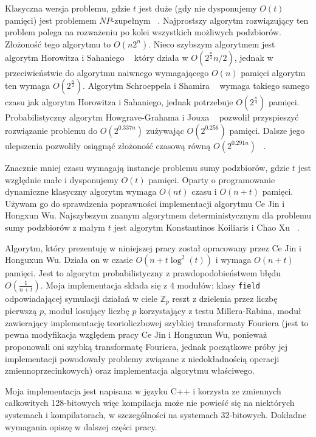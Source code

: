 \documentclass{article}
\begin{document}
Klasyczna wersja problemu, gdzie $t$ jest duże (gdy nie dysponujemy $O(t)$ pamięci) jest problemem 
$NP$-zupełnym ~\cite{sasamoto2001statistical}. Najprostszy algorytm rozwiązujący ten problem polega na rozważeniu po kolei wszystkich 
możliwych podzbiorów. Złożoność tego algorytmu to $O(n2^n)$. Nieco szybszym algorytmem jest algorytm Horowitza
i Sahaniego ~\cite{horowitz1974computing} który działa w $O(2^{\frac{n}{2}}n/2)$, jednak w przeciwieństwie do algorytmu naiwnego wymagającego
$O(n)$ pamięci algorytm ten wymaga $O(2^{\frac{n}{2}})$. Algorytm Schroeppela i Shamira ~\cite{schroeppel1981t} wymaga takiego samego
czasu jak algorytm Horowitza i Sahaniego, jednak potrzebuje $O(2^{\frac{n}{4}})$ pamięci. Probabilistyczny 
algorytm Howgrave-Grahama i Jouxa ~\cite{howgrave2010new} pozwolił przyspieszyć rozwiązanie problemu do $O(2^{0.337n})$
zużywając $O(2^{0.256})$ pamięci. Dalsze jego ulepszenia pozwoliły osiągnąć złożoność czasową równą 
$O(2^{0.291n})$ ~\cite{becker2011improved}.

Znacznie mniej czasu wymagają instancje problemu sumy podzbiorów, gdzie $t$ jest względnie małe i dysponujemy
$O(t)$ pamięci. Oparty o programowanie dynamiczne klasyczny algorytm wymaga $O(nt)$ czasu i $O(n+t)$ pamięci.
Używam go do sprawdzenia poprawności implementacji algorytmu Ce Jin i Hongxun Wu. Najszybszym znanym algorytmem deterministycznym
dla problemu sumy podzbiorów z małym $t$ jest algorytm Konstantinos Koiliaris i Chao Xu ~\cite{bach1997comments}. 

Algorytm, który prezentuję w niniejszej pracy został opracowany przez Ce Jin i Honguxun Wu. Działa on w czasie 
$O(n+t\log^2(t))$ i wymaga $O(n+t)$ pamięci. Jest to algorytm probabilistyczny z prawdopodobieństwem błędu $O(\frac{1}{n+t})$.
Moja implementacja składa się z 4 modułów: klasy \texttt{field} odpowiadającej symulacji 
działań w ciele $\mathbb{Z}_p$ reszt z dzielenia przez liczbę pierwszą $p$, moduł losujący liczbę $p$ korzystający z testu 
Millera-Rabina,
moduł zawierający implementację teorioliczbowej szybkiej transformaty Fouriera (jest to pewna modyfikacja względem pracy
Ce Jin i Honguxun Wu, ponieważ proponowali oni szybką transformatę Fouriera, jednak początkowe próby jej implementacji
powodowały problemy związane z niedokładnością operacji zmiennoprzecinkowych) oraz implementacja algorytmu właściwego.

Moja implementacja jest napisana w języku C++ i korzysta ze zmiennych całkowitych 128-bitowych więc kompilacja może nie 
powieść się na niektórych systemach i kompilatorach, w szczególności na systemach 32-bitowych. Dokładne wymagania opiszę
w dalszej części pracy.
\end{document}
